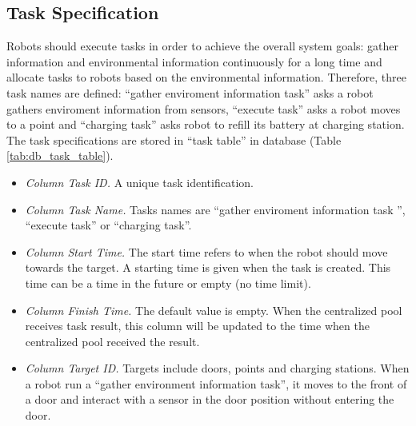 \subsection{Task Specification}
Robots should execute tasks in order to achieve the overall system goals: gather information and environmental information continuously for a long time and allocate tasks to robots based on the environmental information.  Therefore, three task names are defined: ``gather enviroment information task'' asks a robot gathers enviroment information from sensors, ``execute task'' asks a robot moves to a point and  ``charging task'' asks robot to refill its battery at charging station.
The task specifications are stored in ``task table'' in database (Table \ref{tab:db_task_table}).
\begin{table}[htb]
\centering
{}
\caption{Task Table in Database}
\label{tab:db_task_table}
\begin{itemize}
	\label{sec:task_table}
	\item \textsl{Column Task ID.} A unique task identification.
	\item \textsl{Column Task Name.} Tasks names are ``gather enviroment information task '', ``execute task'' or ``charging task''.
	\item \textsl{Column Start Time.} The start time refers to when the robot should move towards the target. A starting time is given when the task is created. This time can be a time in the future or empty (no time limit). 
	\item \textsl{Column Finish Time.} The default value is empty. When the centralized pool receives task result, this column will be updated to the time when the centralized pool received the result.
	\item \textsl{Column Target ID.} Targets include doors, points and charging stations. When a robot run a ``gather environment information task'', it moves to the front of a door and interact with a sensor in the door position without entering the door. 

\end{itemize}
\end{table}
